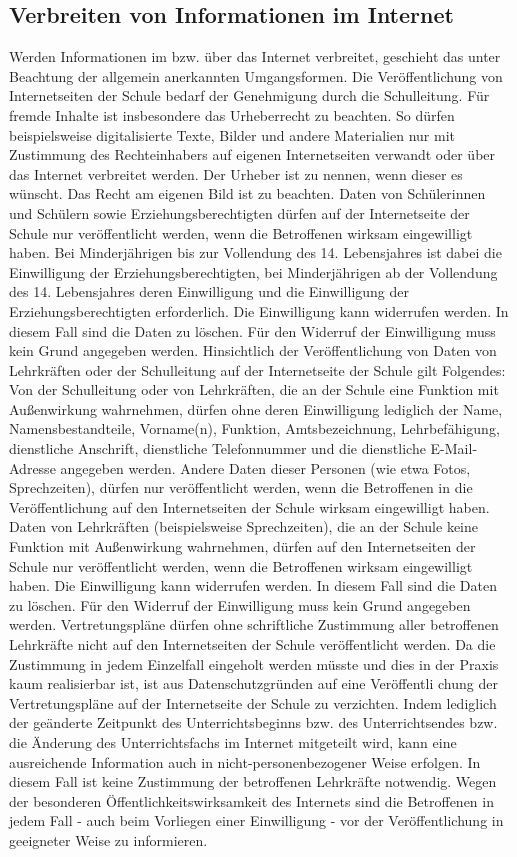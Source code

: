 \documentclass[a4paper, parskip]{scrartcl}
\begin{document}
\subsection{Verbreiten von Informationen im Internet}
Werden Informationen im bzw. über das Internet verbreitet, geschieht das unter
Beachtung der allgemein anerkannten Umgangsformen. Die Veröffentlichung von
Internetseiten der Schule bedarf der Genehmigung durch die Schulleitung. Für
fremde Inhalte ist insbesondere das Urheberrecht zu beachten. So dürfen
beispielsweise digitalisierte Texte, Bilder und andere Materialien nur mit
Zustimmung des Rechteinhabers auf eigenen Internetseiten verwandt oder über das
Internet verbreitet werden. Der Urheber ist zu nennen, wenn dieser es
wünscht. Das Recht am eigenen Bild ist zu beachten.
Daten von Schülerinnen und Schülern sowie Erziehungsberechtigten dürfen auf der
Internetseite der Schule nur veröffentlicht werden, wenn die Betroffenen
wirksam eingewilligt haben. Bei Minderjährigen bis zur Vollendung des 14.
Lebensjahres ist dabei die Einwilligung der Erziehungsberechtigten, bei
Minderjährigen ab der Vollendung des 14. Lebensjahres deren Einwilligung und
die Einwilligung der Erziehungsberechtigten erforderlich. Die Einwilligung kann
widerrufen werden. In diesem Fall sind die Daten zu löschen. Für den Widerruf
der Einwilligung muss kein Grund angegeben werden.
Hinsichtlich der Veröffentlichung von Daten von Lehrkräften oder der
Schulleitung auf der Internetseite der Schule gilt Folgendes:
Von der Schulleitung oder von Lehrkräften, die an der Schule eine Funktion mit
Außenwirkung wahrnehmen, dürfen ohne deren Einwilligung lediglich der Name,
Namensbestandteile, Vorname(n), Funktion, Amtsbezeichnung, Lehrbefähigung,
dienstliche Anschrift, dienstliche Telefonnummer und die dienstliche
E-Mail-Adresse angegeben werden. Andere Daten dieser Personen (wie etwa Fotos,
Sprechzeiten), dürfen nur veröffentlicht werden, wenn die Betroffenen in die
Veröffentlichung auf den Internetseiten der Schule wirksam eingewilligt
haben.
Daten von Lehrkräften (beispielsweise Sprechzeiten), die an der Schule keine
Funktion mit Außenwirkung wahrnehmen, dürfen auf den Internetseiten der
Schule nur veröffentlicht werden, wenn die Betroffenen wirksam eingewilligt
haben. Die Einwilligung kann widerrufen werden. In diesem Fall sind die Daten
zu löschen. Für den Widerruf der Einwilligung muss kein Grund angegeben werden.
Vertretungspläne dürfen ohne schriftliche Zustimmung aller betroffenen
Lehrkräfte nicht auf den Internetseiten der Schule veröffentlicht werden. Da
die Zustimmung in jedem Einzelfall eingeholt werden müsste und dies in der
Praxis kaum realisierbar ist, ist aus Datenschutzgründen auf eine Veröffentli
chung der Vertretungspläne auf der Internetseite der Schule zu verzichten.
Indem lediglich der geänderte Zeitpunkt des Unterrichtsbeginns bzw. des
Unterrichtsendes bzw. die Änderung des Unterrichtsfachs im Internet mitgeteilt
wird, kann eine ausreichende Information auch in nicht-personenbezogener Weise
erfolgen. In diesem Fall ist keine Zustimmung der betroffenen Lehrkräfte
notwendig.
Wegen der besonderen Öffentlichkeitswirksamkeit des Internets sind die
Betroffenen in jedem Fall - auch beim Vorliegen einer Einwilligung - vor der
Veröffentlichung in geeigneter Weise zu informieren.
\end{document}
